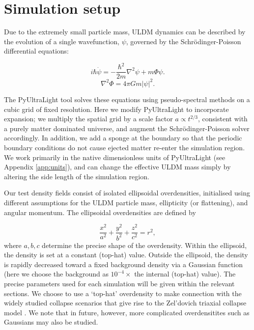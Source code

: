 \documentclass[a4paper,11pt]{article}
\begin{document}
\section{Simulation setup}\label{sec:sims}

Due to the extremely small particle mass, ULDM dynamics can be described by the evolution of a single wavefunction, $\psi$, governed by the Schr{\"o}dinger-Poisson differential equations:

\begin{equation}\label{eq:schrodinger}
    i\hbar\Dot{\psi}=-\frac{\hbar^2}{2m}\nabla^2\psi+m\Phi\psi.
\end{equation}
\begin{equation}\label{eq:poisson}
    \nabla^2\Phi=4\pi G m \vert\psi\vert^2.
\end{equation}

The {\sc PyUltraLight} tool solves these equations using pseudo-spectral methods on a cubic grid of fixed resolution. Here we modify {\sc PyUltraLight} to incorporate expansion; we multiply the spatial grid by a scale factor $a\propto t^{2/3}$, consistent with a purely matter dominated universe, and augment the Schr{\"o}dinger-Poisson solver accordingly. In addition, we add a sponge at the boundary so that the periodic boundary conditions do not cause ejected matter re-enter the simulation region. We work primarily in the native dimensionless units of {\sc PyUltraLight} (see Appendix \ref{app:units}), and can change the effective ULDM mass simply by altering the side length of the simulation region. 

Our test density fields consist of isolated ellipsoidal overdensities, initialised using different assumptions for the ULDM particle mass, ellipticity (or flattening), and angular momentum. The ellipsoidal overdensities are defined by

\begin{equation}\label{eq:ellipse}
    \frac{x^2}{a^2}+\frac{y^2}{b^2}+\frac{z^2}{c^2} = r^2,
\end{equation}
where $a, b, c$ determine the precise shape of the overdensity. Within the ellipsoid, the density is set at a constant (top-hat) value. Outside the ellipsoid, the density is rapidly decreased toward a fixed background density via a Gaussian function (here we choose the background as $10^{-4}\times$ the internal (top-hat) value). The precise parameters used for each simulation will be given within the relevant sections. We choose to use a `top-hat' overdensity to make connection with the widely studied collapse scenarios that give rise to the Zel'dovich triaxial collapse model \cite{Mead:2016ybv, Zeldovich:1969sb}. We note that in future, however, more complicated overdensitites such as Gaussians may also be studied. 
\end{document}

